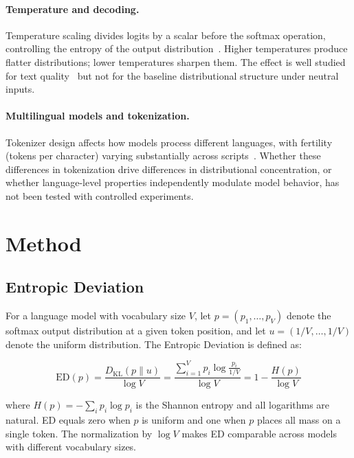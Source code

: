 \documentclass{article}
\newcommand{\ED}{\mathrm{ED}}
\newcommand{\DKL}{D_{\mathrm{KL}}}
\begin{document}
\paragraph{Temperature and decoding.}
Temperature scaling divides logits by a scalar before the softmax operation, controlling the entropy of the output distribution~\citep{holtzman2020curious}. Higher temperatures produce flatter distributions; lower temperatures sharpen them. The effect is well studied for text quality~\citep{guo2017calibration} but not for the baseline distributional structure under neutral inputs.

\paragraph{Multilingual models and tokenization.}
Tokenizer design affects how models process different languages, with fertility (tokens per character) varying substantially across scripts~\citep{rust2021good, sennrich2016neural}. Whether these differences in tokenization drive differences in distributional concentration, or whether language-level properties independently modulate model behavior, has not been tested with controlled experiments.

\section{Method}
\label{sec:method}

\subsection{Entropic Deviation}

For a language model with vocabulary size $V$, let $p = (p_1, \ldots, p_V)$ denote the softmax output distribution at a given token position, and let $u = (1/V, \ldots, 1/V)$ denote the uniform distribution. The Entropic Deviation is defined as:

\begin{equation}
\ED(p) = \frac{\DKL(p \| u)}{\log V} = \frac{\sum_{i=1}^{V} p_i \log \frac{p_i}{1/V}}{\log V} = 1 - \frac{H(p)}{\log V}
\label{eq:ed}
\end{equation}

\noindent where $H(p) = -\sum_i p_i \log p_i$ is the Shannon entropy and all logarithms are natural. ED equals zero when $p$ is uniform and one when $p$ places all mass on a single token. The normalization by $\log V$ makes ED comparable across models with different vocabulary sizes.
\end{document}
